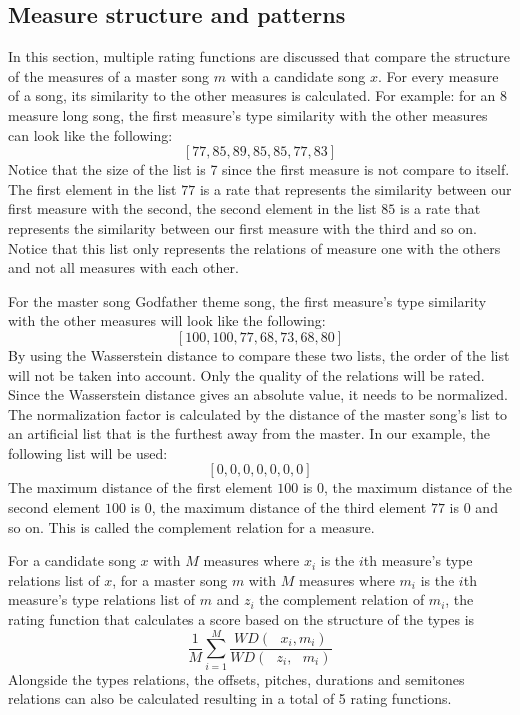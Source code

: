 \subsection{Measure structure and patterns}
In this section, multiple rating functions are discussed that compare the  structure of the measures of a master song $m$ with a candidate song $x$. For every measure of a song, its similarity to the other measures is calculated.
For example: for an 8 measure long song, the first measure's type similarity with the other measures can look like the following:
\[[77, 85, 89, 85, 85, 77, 83]\]
Notice that the size of the list is 7 since the first measure is not compare to itself.  The first element in the list $77$ is a rate that represents the similarity between our first measure with the second, the second element in the list $85$ is a rate that represents the similarity between our first measure with the third and so on. Notice that this list only represents the relations of measure one with the others and not all measures with each other.

For the master song  Godfather theme song, the first measure's type similarity with the other measures will look like the following:
\[[100, 100, 77, 68, 73, 68, 80]\]
By using the Wasserstein distance to compare these two lists, the order of the list will not be taken into account. Only the quality of the relations will be rated. Since the Wasserstein distance gives an absolute value, it needs to be normalized. The normalization factor is calculated by the distance of the master song's list to an artificial list that is the furthest away from the master. In our example, the following list will be used:
\[[0, 0, 0, 0, 0, 0, 0]\]
The maximum distance of the first element $100$ is $0$, the maximum distance of the second element $100$ is $0$, the maximum distance of the third element $77$ is $0$ and so on. This is called the complement relation for a measure.

For a candidate song $x$ with $M$ measures where $x_{i}$ is the $i$th measure's type relations list of $x$, for a master song $m$ with $M$ measures where $m_{i}$ is the $i$th measure's type relations list of $m$ and $z_{i}$ the complement relation of $m_{i}$, the rating function that calculates a score based on the structure of the types is
\[\frac{1}{M}\sum_{i=1}^{M} \frac{WD(\textit{ $x_i$},\textit{$m_i$})} {WD(\textit{ $z_i$},\textit{ $m_i$})} \]
Alongside the types relations, the offsets, pitches, durations and semitones relations can also be calculated resulting in a total of 5 rating functions.
